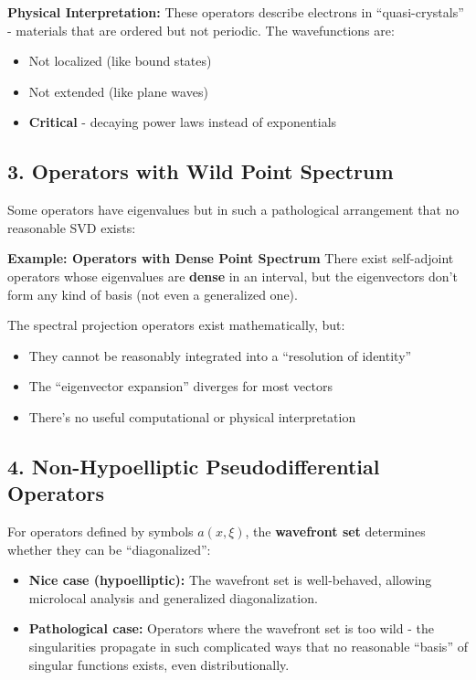\documentclass[aps,prl,reprint]{revtex4-2}
\begin{document}
\textbf{Physical Interpretation:} These operators describe electrons in
``quasi-crystals'' - materials that are ordered but not periodic. The
wavefunctions are:

\begin{itemize}
\item Not localized (like bound states)

\item Not extended (like plane waves)

\item \textbf{Critical} - decaying power laws instead of exponentials
\end{itemize}

\subsection*{3. Operators with Wild Point Spectrum}

Some operators have eigenvalues but in such a pathological arrangement that
no reasonable SVD exists:

\textbf{Example: Operators with Dense Point Spectrum} There exist
self-adjoint operators whose eigenvalues are \textbf{dense} in an interval,
but the eigenvectors don't form any kind of basis (not even a generalized
one).

The spectral projection operators exist mathematically, but:

\begin{itemize}
\item They cannot be reasonably integrated into a ``resolution of identity''

\item The ``eigenvector expansion'' diverges for most vectors

\item There's no useful computational or physical interpretation
\end{itemize}

\subsection*{4. Non-Hypoelliptic Pseudodifferential Operators}

For operators defined by symbols $a(x,\xi)$, the \textbf{wavefront set}
determines whether they can be ``diagonalized'':

\begin{itemize}
\item \textbf{Nice case (hypoelliptic):} The wavefront set is well-behaved,
allowing microlocal analysis and generalized diagonalization.

\item \textbf{Pathological case:} Operators where the wavefront set is too
wild - the singularities propagate in such complicated ways that no
reasonable ``basis'' of singular functions exists, even distributionally.
\end{itemize}
\end{document}
